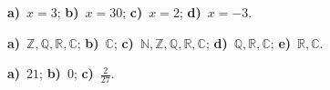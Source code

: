 \begin{EAnswer}{1.1}
\textbf{a)}~$x=3$; \textbf{b)}~$x=30$; \textbf{c)}~$x=2$; \textbf{d)}~$x=-3$.
\end{EAnswer}
\begin{EAnswer}{1.2}
\textbf{a)}~$\mathbb{Z}, \mathbb{Q}, \mathbb{R},\mathbb{C}$;
					\textbf{b)}~$\mathbb{C}$;
					\textbf{c)}~$\mathbb{N},\mathbb{Z}, \mathbb{Q}, \mathbb{R},\mathbb{C}$;
					\textbf{d)}~$\mathbb{Q}, \mathbb{R},\mathbb{C}$;
					\textbf{e)}~$\mathbb{R},\mathbb{C}$.
\end{EAnswer}
\begin{EAnswer}{1.3}
\textbf{a)}~$21$; \textbf{b)}~$0$; \textbf{c)}~$\frac{2}{27}$.
\end{EAnswer}
